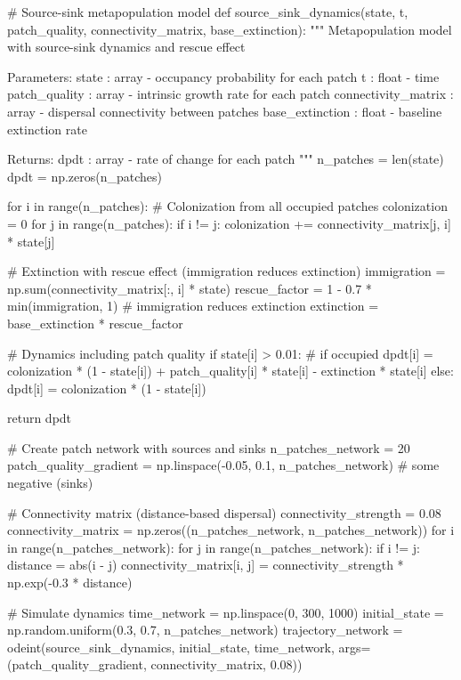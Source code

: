 \documentclass[11pt,a4paper]{article}
\begin{document}
\begin{pycode}
# Source-sink metapopulation model
def source_sink_dynamics(state, t, patch_quality, connectivity_matrix, base_extinction):
    """
    Metapopulation model with source-sink dynamics and rescue effect

    Parameters:
    state : array - occupancy probability for each patch
    t : float - time
    patch_quality : array - intrinsic growth rate for each patch
    connectivity_matrix : array - dispersal connectivity between patches
    base_extinction : float - baseline extinction rate

    Returns:
    dpdt : array - rate of change for each patch
    """
    n_patches = len(state)
    dpdt = np.zeros(n_patches)

    for i in range(n_patches):
        # Colonization from all occupied patches
        colonization = 0
        for j in range(n_patches):
            if i != j:
                colonization += connectivity_matrix[j, i] * state[j]

        # Extinction with rescue effect (immigration reduces extinction)
        immigration = np.sum(connectivity_matrix[:, i] * state)
        rescue_factor = 1 - 0.7 * min(immigration, 1)  # immigration reduces extinction
        extinction = base_extinction * rescue_factor

        # Dynamics including patch quality
        if state[i] > 0.01:  # if occupied
            dpdt[i] = colonization * (1 - state[i]) + patch_quality[i] * state[i] - extinction * state[i]
        else:
            dpdt[i] = colonization * (1 - state[i])

    return dpdt

# Create patch network with sources and sinks
n_patches_network = 20
patch_quality_gradient = np.linspace(-0.05, 0.1, n_patches_network)  # some negative (sinks)

# Connectivity matrix (distance-based dispersal)
connectivity_strength = 0.08
connectivity_matrix = np.zeros((n_patches_network, n_patches_network))
for i in range(n_patches_network):
    for j in range(n_patches_network):
        if i != j:
            distance = abs(i - j)
            connectivity_matrix[i, j] = connectivity_strength * np.exp(-0.3 * distance)

# Simulate dynamics
time_network = np.linspace(0, 300, 1000)
initial_state = np.random.uniform(0.3, 0.7, n_patches_network)
trajectory_network = odeint(source_sink_dynamics, initial_state, time_network,
                           args=(patch_quality_gradient, connectivity_matrix, 0.08))


\end{pycode}
\end{document}
